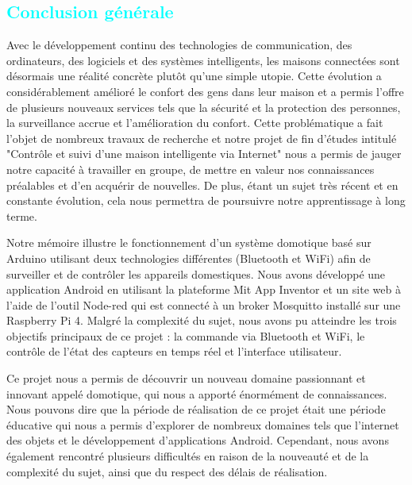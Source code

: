 
\begin{flushleft}
	\section*{\textcolor{cyan}{Conclusion générale}}
	Avec le développement continu des technologies de communication, des ordinateurs, des logiciels et des systèmes intelligents, les maisons connectées sont désormais une réalité concrète plutôt qu'une simple utopie. Cette évolution a considérablement amélioré le confort des gens dans leur maison et a permis l'offre de plusieurs nouveaux services tels que la sécurité et la protection des personnes, la surveillance accrue et l'amélioration du confort. Cette problématique a fait l'objet de nombreux travaux de recherche et notre projet de fin d'études intitulé "Contrôle et suivi d'une maison intelligente via Internet" nous a permis de jauger notre capacité à travailler en groupe, de mettre en valeur nos connaissances préalables et d'en acquérir de nouvelles. De plus, étant un sujet très récent et en constante évolution, cela nous permettra de poursuivre notre apprentissage à long terme.\newline
	
	Notre mémoire illustre le fonctionnement d'un système domotique basé sur Arduino utilisant deux technologies différentes (Bluetooth et WiFi) afin de surveiller et de contrôler les appareils domestiques. Nous avons développé une application Android en utilisant la plateforme Mit App Inventor et un site web à l'aide de l'outil Node-red qui est connecté à un broker Mosquitto installé sur une Raspberry Pi 4. Malgré la complexité du sujet, nous avons pu atteindre les trois objectifs principaux de ce projet : la commande via Bluetooth et WiFi, le contrôle de l'état des capteurs en temps réel et l'interface utilisateur.\newline
	
	Ce projet nous a permis de découvrir un nouveau domaine passionnant et innovant appelé domotique, qui nous a apporté énormément de connaissances. Nous pouvons dire que la période de réalisation de ce projet était une période éducative qui nous a permis d'explorer de nombreux domaines tels que l'internet des objets et le développement d'applications Android. Cependant, nous avons également rencontré plusieurs difficultés en raison de la nouveauté et de la complexité du sujet, ainsi que du respect des délais de réalisation.
\end{flushleft}

\newpage
